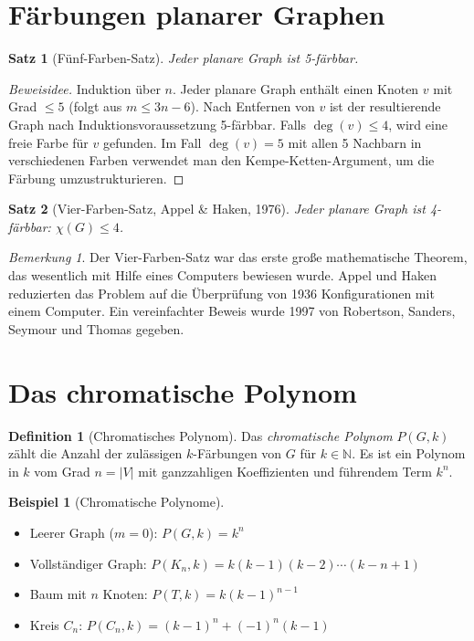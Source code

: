 ﻿\documentclass[a4paper,12pt,openany,oneside]{book}
\theoremstyle{definition}
\newtheorem{definition}{Definition}[chapter]
\newtheorem{beispiel}{Beispiel}[chapter]
\theoremstyle{plain}
\newtheorem{satz}{Satz}[chapter]
\theoremstyle{remark}
\newtheorem{bemerkung}{Bemerkung}[chapter]
\begin{document}
\section{F\"arbungen planarer Graphen}

\begin{satz}[F\"unf-Farben-Satz]
  Jeder planare Graph ist 5-f\"arbbar.
\end{satz}

\begin{proof}[Beweisidee]
  Induktion \"uber $n$. Jeder planare Graph enth\"alt einen Knoten $v$ mit
  Grad $\leq 5$ (folgt aus $m \leq 3n-6$). Nach Entfernen von $v$ ist der
  resultierende Graph nach Induktionsvoraussetzung 5-f\"arbbar. Falls
  $\deg(v) \leq 4$, wird eine freie Farbe f\"ur $v$ gefunden. Im Fall
  $\deg(v) = 5$ mit allen 5 Nachbarn in verschiedenen Farben verwendet man
  den Kempe-Ketten-Argument, um die F\"arbung umzustrukturieren.
\end{proof}

\begin{satz}[Vier-Farben-Satz, Appel \& Haken, 1976]
  Jeder planare Graph ist 4-f\"arbbar: $\chi(G) \leq 4$.
\end{satz}

\begin{bemerkung}
  Der Vier-Farben-Satz war das erste gro\ss{}e mathematische Theorem, das
  wesentlich mit Hilfe eines Computers bewiesen wurde. Appel und Haken
  reduzierten das Problem auf die \"Uberpr\"ufung von 1936 Konfigurationen
  mit einem Computer. Ein vereinfachter Beweis wurde 1997 von Robertson,
  Sanders, Seymour und Thomas gegeben.
\end{bemerkung}

\section{Das chromatische Polynom}

\begin{definition}[Chromatisches Polynom]
  Das \emph{chromatische Polynom} $P(G, k)$ z\"ahlt die Anzahl der
  zul\"assigen $k$-F\"arbungen von $G$ f\"ur $k \in \mathbb{N}$.
  Es ist ein Polynom in $k$ vom Grad $n = |V|$ mit ganzzahligen
  Koeffizienten und f\"uhrendem Term $k^n$.
\end{definition}

\begin{beispiel}[Chromatische Polynome]
  \begin{itemize}
    \item Leerer Graph ($m=0$): $P(G, k) = k^n$
    \item Vollst\"andiger Graph: $P(K_n, k) = k(k-1)(k-2)\cdots(k-n+1)$
    \item Baum mit $n$ Knoten: $P(T, k) = k(k-1)^{n-1}$
    \item Kreis $C_n$: $P(C_n, k) = (k-1)^n + (-1)^n(k-1)$
  \end{itemize}
\end{beispiel}
\end{document}
